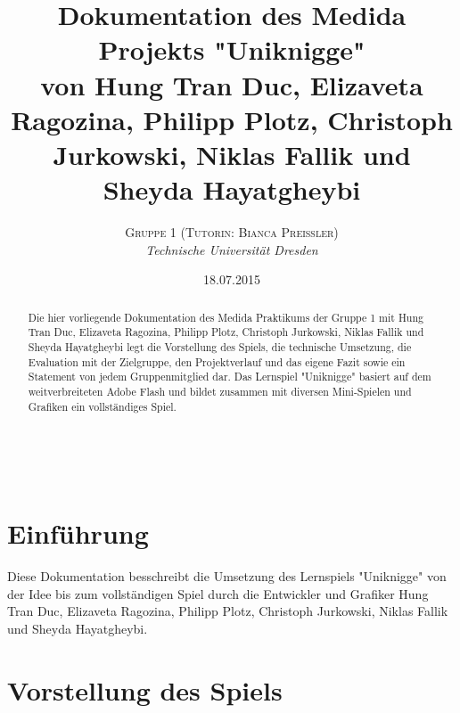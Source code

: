 \documentclass[a4paper, 11pt]{article} %
\title{\textbf{Dokumentation des Medida Projekts "Uniknigge"}\\ %
von Hung Tran Duc, Elizaveta Ragozina, Philipp Plotz, Christoph Jurkowski, Niklas Fallik und Sheyda Hayatgheybi} %
\author{\textsc{Gruppe 1 (Tutorin: Bianca Preißler)} %
\\{\textit{Technische Universität Dresden}}} %
\date{18.07.2015} %
\makeatletter
\renewcommand{\maketitle}{ %
\begin{flushright} %
{\LARGE\@title} %

\vspace{50pt} %

{\large\@author} %
\\\@date %

\vspace{40pt} %
\end{flushright}
}
\makeatother
\begin{document}
\maketitle %


\renewcommand{\abstractname}{Präambel} %

\vspace{5cm} %


\begin{abstract}
\noindent
Die hier vorliegende Dokumentation des Medida Praktikums der Gruppe 1 mit Hung Tran Duc, Elizaveta Ragozina, Philipp Plotz, Christoph Jurkowski, Niklas Fallik und Sheyda Hayatgheybi legt die Vorstellung des Spiels, die technische Umsetzung, die Evaluation mit der Zielgruppe, den Projektverlauf
und das eigene Fazit sowie ein Statement von jedem Gruppenmitglied dar. Das Lernspiel "Uniknigge" basiert auf dem weitverbreiteten Adobe Flash und bildet zusammen mit diversen Mini-Spielen und Grafiken ein vollständiges Spiel.
\end{abstract}



\newpage
\renewcommand{\contentsname}{Inhaltsverzeichnis}
\tableofcontents

\newpage
\section{Einführung}
Diese Dokumentation besschreibt die Umsetzung des Lernspiels "Uniknigge" von der Idee bis zum vollständigen Spiel durch die Entwickler und Grafiker Hung Tran Duc, Elizaveta Ragozina, Philipp Plotz, Christoph Jurkowski, Niklas Fallik und Sheyda Hayatgheybi.

\section{Vorstellung des Spiels}
\end{document}
